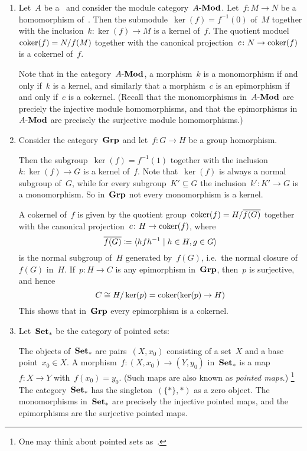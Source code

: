 \begin{example}
  \leavevmode
  \begin{enumerate}
    \item
      Let~$A$ be a~{\kalg} and consider the module category~$\text{$A$-$\mathbf{Mod}$}$.
      Let~$f \colon M \to N$ be a homomorphism of~{}.
      Then the submodule~$\ker(f) = f^{-1}(0)$ of~$M$ together with the inclusion~$k \colon \ker(f) \to M$ is a kernel of~$f$.
      The quotient moduel~$\operatorname{coker}(f) = N/f(M)$ together with the canonical projection~$c \colon N \to \operatorname{coker}(f)$ is a cokernel of~$f$.
      
      Note that in the category~$\text{$A$-$\mathbf{Mod}$}$, a morphism~$k$ is a monomorphism if and only if~$k$ is a kernel, and similarly that a morphism~$c$ is an epimorphism if and only if~$c$ is a cokernel.
      (Recall that the monomorphisms in~$\text{$A$-$\mathbf{Mod}$}$ are preciely the injective module homomorphisms, and that the epimorphisms in~$\text{$A$-$\mathbf{Mod}$}$ are precisely the surjective module homomorphisms.)
    \item
      Consider the category~$\mathbf{Grp}$ and let~$f \colon G \to H$ be a group homorphism.
      
      Then the subgroup~$\ker(f) = f^{-1}(1)$ together with the inclusion~$k \colon \ker(f) \to G$ is a kernel of~$f$.
      Note that~$\ker(f)$ is always a normal subgroup of~$G$, while for every subgroup~$K' \subseteq G$ the inclusion~$k' \colon K' \to G$ is a monomorphism.
      So in~$\mathbf{Grp}$ not every monomorphism is a kernel.
      
      A cokernel of~$f$ is given by the quotient group~$\operatorname{coker}(f) = H/\overline{f(G)}$ together with the canonical projection~$c \colon H \to \operatorname{coker}(f)$, where
      \[
                  \closure{f(G)}
        \defined  \gen{
                    h f h^{-1}
                  \suchthat
                    h \in H, g \in G
                  }
      \]
      is the normal subgroup of~$H$ generated by~$f(G)$, i.e.\ the normal closure of~$f(G)$ in~$H$.
      If~$p \colon H \to C$ is any epimorphism in~$\mathbf{Grp}$, then~$p$ is surjective, and hence
      \[
              C
        \cong H/\ker(p)
        =     \operatorname{coker}(\ker(p) \to H)
      \]
      This shows that in~$\mathbf{Grp}$ every epimorphism is a cokernel.
    \item
      Let~$\mathbf{Set}_*$ be the category of pointed sets:
      
      The objects of~$\mathbf{Set}_*$ are pairs~$(X,x_0)$ consisting of a set~$X$ and a base point~$x_0 \in X$.
      A morphism~$f \colon (X,x_0) \to (Y,y_0)$ in~$\mathbf{Set}_*$ is a map~$f \colon X \to Y$ with~$f(x_0) = y_0$.
      (Such maps are also known as \emph{pointed maps}.)%
      \footnote{One may think about pointed sets as~.}
      The category~$\mathbf{Set}_*$ has the singleton~$(\{\ast\}, \ast)$ as a zero object.
      The monomorphisms in~$\mathbf{Set}_*$ are precisely the injective pointed maps, and the epimorphisms are the surjective pointed maps.
      

\end{enumerate}
\end{example}
